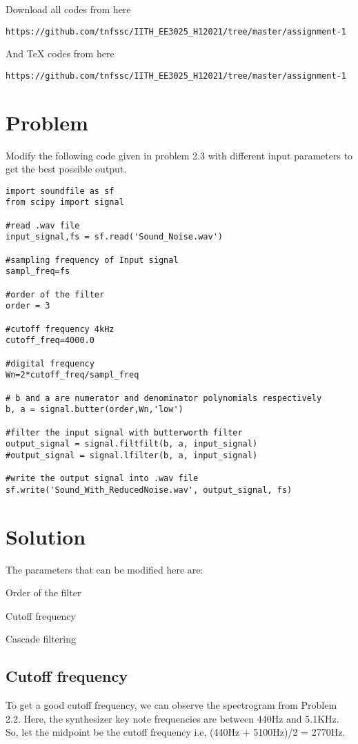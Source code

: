 \documentclass[journal,12pt]{IEEEtran}
\begin{document}
Download all codes from here
\begin{lstlisting}
https://github.com/tnfssc/IITH_EE3025_H12021/tree/master/assignment-1
\end{lstlisting}
And TeX codes from here
\begin{lstlisting}
https://github.com/tnfssc/IITH_EE3025_H12021/tree/master/assignment-1
\end{lstlisting}

\section{\textbf{Problem}}

Modify the following code given in problem 2.3 with different input parameters to get the best possible output.
\begin{lstlisting}
import soundfile as sf
from scipy import signal

#read .wav file
input_signal,fs = sf.read('Sound_Noise.wav')

#sampling frequency of Input signal
sampl_freq=fs

#order of the filter
order = 3

#cutoff frequency 4kHz
cutoff_freq=4000.0

#digital frequency
Wn=2*cutoff_freq/sampl_freq

# b and a are numerator and denominator polynomials respectively
b, a = signal.butter(order,Wn,'low')

#filter the input signal with butterworth filter
output_signal = signal.filtfilt(b, a, input_signal)
#output_signal = signal.lfilter(b, a, input_signal)

#write the output signal into .wav file
sf.write('Sound_With_ReducedNoise.wav', output_signal, fs)
\end{lstlisting}

\section{\textbf{Solution}}
The parameters that can be modified here are:
\begin{description}[font=$\bullet$\scshape\bfseries]
  \item[]{Order of the filter}
  \item[]{Cutoff frequency}
  \item[]{Cascade filtering}
\end{description}

\subsection{\textbf{Cutoff frequency}}
To get a good cutoff frequency, we can observe the spectrogram from Problem 2.2. Here, the synthesizer key note frequencies are between 440Hz and 5.1KHz. So, let the midpoint be the cutoff frequency i.e, (440Hz + 5100Hz)/2 = 2770Hz.
\end{document}
